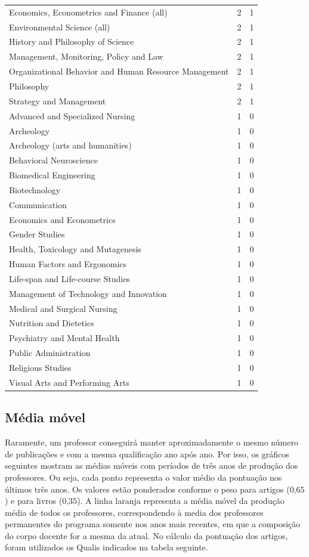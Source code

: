 \documentclass[12pt,brazil]{article}\usepackage[]{graphicx}\usepackage[]{xcolor}
\newcounter{tabela}
\begin{document}
\begin{longtable}{lrr}
Economics, Econometrics and Finance (all) & 2 & 1 \\
Environmental Science (all) & 2 & 1 \\
History and Philosophy of Science & 2 & 1 \\
Management, Monitoring, Policy and Law & 2 & 1 \\
Organizational Behavior and Human Resource Management & 2 & 1 \\
Philosophy & 2 & 1 \\
Strategy and Management & 2 & 1 \\
Advanced and Specialized Nursing & 1 & 0 \\
Archeology & 1 & 0 \\
Archeology (arts and humanities) & 1 & 0 \\
Behavioral Neuroscience & 1 & 0 \\
Biomedical Engineering & 1 & 0 \\
Biotechnology & 1 & 0 \\
Communication & 1 & 0 \\
Economics and Econometrics & 1 & 0 \\
Gender Studies & 1 & 0 \\
Health, Toxicology and Mutagenesis & 1 & 0 \\
Human Factors and Ergonomics & 1 & 0 \\
Life-span and Life-course Studies & 1 & 0 \\
Management of Technology and Innovation & 1 & 0 \\
Medical and Surgical Nursing & 1 & 0 \\
Nutrition and Dietetics & 1 & 0 \\
Psychiatry and Mental Health & 1 & 0 \\
Public Administration & 1 & 0 \\
Religious Studies & 1 & 0 \\
Visual Arts and Performing Arts & 1 & 0 \\
\end{longtable}


\newpage

\subsection{Média móvel}

Raramente, um professor conseguirá manter aproximadamente o mesmo número de
publicações e com a mesma qualificação ano após ano. Por isso, os gráficos
seguintes mostram as médias móveis com períodos de três anos de produção dos
professores. Ou seja, cada ponto representa o valor médio da pontuação nos
últimos três anos. Os valores estão ponderados conforme o peso para artigos
($\text{0,65}$) e para livros ($\text{0,35}$). A linha laranja
representa a média móvel da produção média de todos os professores,
correspondendo à media dos professores permanentes do programa somente nos
anos mais recentes, em que a composição do corpo docente for a mesma da atual.
No cálculo da pontuação dos artigos, foram utilizados os Qualis indicados na
tabela seguinte.
\end{document}
